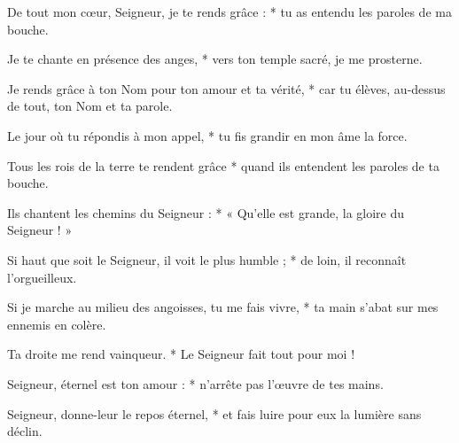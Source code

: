 \item De tout mon cœur, Seigneur, je te rends grâce : * tu as entendu les paroles de ma bouche.

\item Je te chante en présence des anges, * vers ton temple sacré, je me prosterne.

\item Je rends grâce à ton Nom pour ton amour et ta vérité, * car tu élèves, au-dessus de tout, ton Nom et ta parole.

\item Le jour où tu répondis à mon appel, * tu fis grandir en mon âme la force.

\item Tous les rois de la terre te rendent grâce * quand ils entendent les paroles de ta bouche.

\item Ils chantent les chemins du Seigneur : * « Qu'elle est grande, la gloire du Seigneur ! »

\item Si haut que soit le Seigneur, il voit le plus humble ; * de loin, il reconnaît l'orgueilleux.

\item Si je marche au milieu des angoisses, tu me fais vivre, * ta main s'abat sur mes ennemis en colère.

\item Ta droite me rend vainqueur. * Le Seigneur fait tout pour moi !

\item Seigneur, éternel est ton amour : * n'arrête pas l'œuvre de tes mains.

\item Seigneur, donne-leur le repos éternel, * et fais luire pour eux la lumière sans déclin.